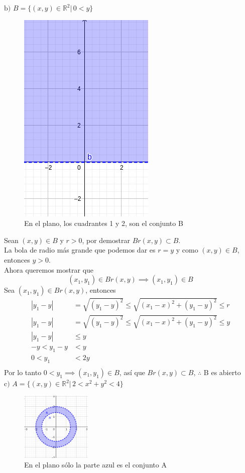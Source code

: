 \documentclass[letterpaper]{article}
\providecommand{\abs}[1]{\left|#1\right|}
\renewcommand{\*}{\cdot}
\theoremstyle{definition}
\begin{document}
$\text{b) }B = \{ (x,y) \in \mathbb{R}^2 \vert \,  0 < y  \}$
\begin{figure}[h]
	\centering
	\includegraphics[height=0.3\textwidth]{1b}
	\caption{En el plano, los cuadrantes 1 y 2, son el conjunto B}
\end{figure}
Sean $ (x,y) \in B $ y $r >0 $, por demostrar $ Br(x,y) \subset B $.\\
La bola de radio más grande que podemos dar es $ r = y $ y como $ (x,y) \in B $, entonces $ y>0 $.\\
Ahora queremos mostrar que
\[ (x_1,y_1)\in Br(x,y) \implies (x_1,y_1)\in B \]  
Sea $ (x_1, y_1)\in Br(x,y) $, entonces
\begin{align*}
	\abs{y_1 - y} &= \sqrt{(y_1 -y)^2} \leq \sqrt{(x_1 - x)^2 + (y_1 - y)^2} \leq r\\
	\abs{y_1 - y} &= \sqrt{(y_1 -y)^2} \leq \sqrt{(x_1 - x)^2 + (y_1 - y)^2} \leq y\\
	\abs{y_1 - y} &\leq y\\
	-y<y_1 - y &< y\\
	0<y_1  &< 2y\\
\end{align*}
Por lo tanto $  0< y_1 \implies (x_1, y_1) \in B$, así que $ Br(x,y) \subset B $, $ \therefore  $ B es abierto\\



\noindent$\text{c) }A = \{ (x,y) \in \mathbb{R}^2 \vert \, 2 < x^2  + y^2 < 4\}$
\begin{figure}[h]
	\centering
	\includegraphics[width=0.3\textwidth]{1c}
	\caption{En el plano sólo la parte azul es el conjunto A}
\end{figure}
\end{document}
